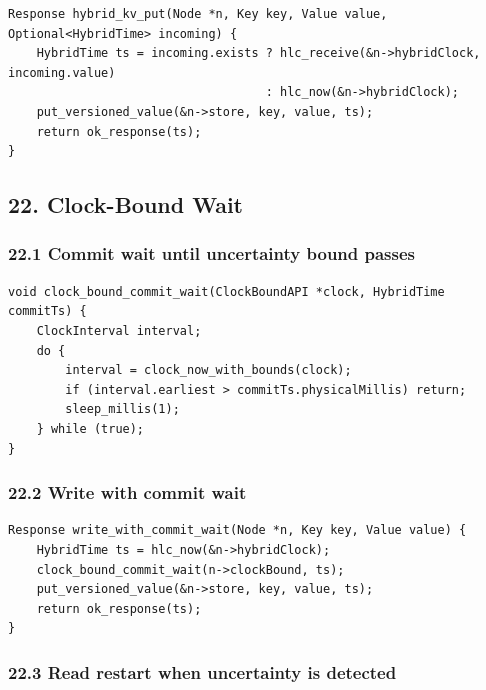\documentclass[10pt,letterpaper]{article}
\begin{document}
\begin{verbatim}
Response hybrid_kv_put(Node *n, Key key, Value value, Optional<HybridTime> incoming) {
    HybridTime ts = incoming.exists ? hlc_receive(&n->hybridClock, incoming.value)
                                    : hlc_now(&n->hybridClock);
    put_versioned_value(&n->store, key, value, ts);
    return ok_response(ts);
}
\end{verbatim}

\subsection*{22. Clock-Bound Wait}

\subsubsection*{22.1 Commit wait until uncertainty bound passes}

\begin{verbatim}
void clock_bound_commit_wait(ClockBoundAPI *clock, HybridTime commitTs) {
    ClockInterval interval;
    do {
        interval = clock_now_with_bounds(clock);
        if (interval.earliest > commitTs.physicalMillis) return;
        sleep_millis(1);
    } while (true);
}
\end{verbatim}

\subsubsection*{22.2 Write with commit wait}

\begin{verbatim}
Response write_with_commit_wait(Node *n, Key key, Value value) {
    HybridTime ts = hlc_now(&n->hybridClock);
    clock_bound_commit_wait(n->clockBound, ts);
    put_versioned_value(&n->store, key, value, ts);
    return ok_response(ts);
}
\end{verbatim}

\subsubsection*{22.3 Read restart when uncertainty is detected}
\end{document}
